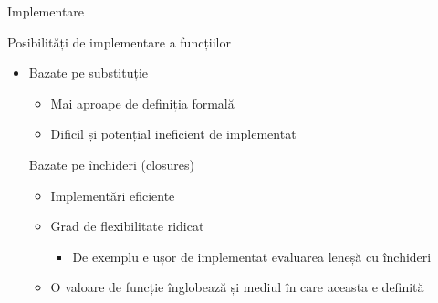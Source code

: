\documentclass[xcolor=pdftex,romanian,colorlinks]{beamer}
\begin{document}
\begin{section}{Implementare}
\begin{frame}{Posibilități de implementare a funcțiilor}
\begin{itemize}
\item Bazate pe substituție
  \begin{itemize}
    \item Mai aproape de definiția formală
    \item Dificil și potențial ineficient de implementat
  \end{itemize}
\vitem Bazate pe închideri (closures)
  \begin{itemize}
    \item Implementări eficiente
    \item Grad de flexibilitate ridicat
       \begin{itemize}
          \item De exemplu e ușor de implementat evaluarea leneșă cu închideri
       \end{itemize}
    \item O valoare de funcție înglobează și mediul în care aceasta e definită
  \end{itemize}
\end{itemize}
\end{frame}

%
\end{section}
\end{document}
